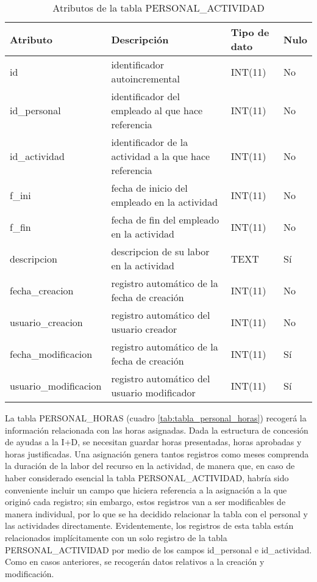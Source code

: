 \begin{table}
\small
\centering
\begin{tabular}{|l|p{2in}|l|l|}\hline
\textbf{Atributo} & \textbf{Descripción} & \textbf{Tipo de dato} &
\textbf{Nulo} \\\hline\hline
id & identificador autoincremental & INT(11) & No\\\hline
id\_personal & identificador del empleado al que hace referencia & INT(11) &
No\\\hline
id\_actividad & identificador de la actividad a la que hace referencia & INT(11)
& No\\\hline
f\_ini & fecha de inicio del empleado en la actividad & INT(11) & No\\\hline
f\_fin & fecha de fin del empleado en la actividad & INT(11) & No\\\hline
descripcion & descripcion de su labor en la actividad & TEXT & Sí\\\hline
fecha\_creacion & registro automático de la fecha de creación & INT(11) &
No\\\hline
usuario\_creacion & registro automático del usuario creador & INT(11) &
No\\\hline
fecha\_modificacion & registro automático de la fecha de creación & INT(11) &
Sí\\\hline
usuario\_modificacion & registro automático del usuario modificador & INT(11) &
Sí\\\hline
\end{tabular}
\caption{Atributos de la tabla PERSONAL\_ACTIVIDAD}
\label{tab:tabla_personal_actividad}
\end{table}

La tabla PERSONAL\_HORAS (cuadro \ref{tab:tabla_personal_horas}) recogerá la
información relacionada con las horas asignadas. Dada la estructura de
concesión de ayudas a la I+D, se necesitan guardar horas presentadas, horas
aprobadas y horas justificadas. Una asignación genera tantos registros como
meses comprenda la duración de la labor del recurso en la actividad, de manera
que, en caso de haber considerado esencial la tabla PERSONAL\_ACTIVIDAD, habría
sido conveniente incluir un campo que hiciera referencia a la asignación a la
que originó cada registro; sin embargo, estos registros van a ser modificables
de manera individual, por lo que se ha decidido relacionar la tabla con el
personal y las actividades directamente. Evidentemente, los registros de esta
tabla están relacionados implícitamente con un solo registro de la tabla
PERSONAL\_ACTIVIDAD por medio de los campos id\_personal e id\_actividad. Como
en casos anteriores, se recogerán datos relativos a la creación y modificación.


